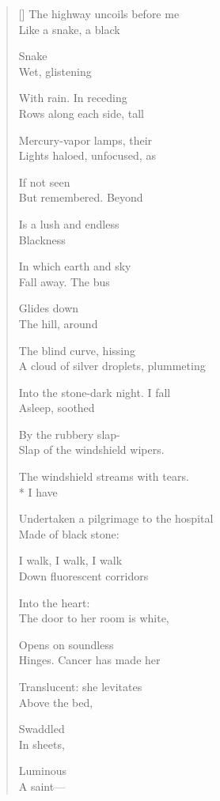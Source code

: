 \label{ch:notime}
\settowidth{\versewidth}{To the black hills coiled by the roadside, the}
\begin{verse}[\versewidth]
The highway uncoils before me\\
Like a snake, a black

Snake\\
Wet, glistening

With rain. \quad In receding\\
Rows along each side, tall

Mercury-vapor lamps, their\\
Lights haloed, unfocused, as

If not seen\\
But remembered. \quad Beyond

Is a lush and endless\\
Blackness

In which earth and sky\\
Fall away. \quad The bus

Glides down\\
The hill, around

The blind curve, hissing\\
A cloud of silver droplets, plummeting

Into the stone-dark night. \quad I fall\\
Asleep, soothed

By the rubbery slap-\\
Slap of the windshield wipers.

The windshield streams with tears.\\*
I have

Undertaken a pilgrimage to the hospital\\
Made of black stone:

I walk, I walk, I walk\\
Down fluorescent corridors

Into the heart:\\
The door to her room is white,

Opens on soundless\\
Hinges. \quad Cancer has made her

Translucent: she levitates\\
Above the bed,

Swaddled\\
In sheets,

Luminous\\
A saint---


\end{verse}
